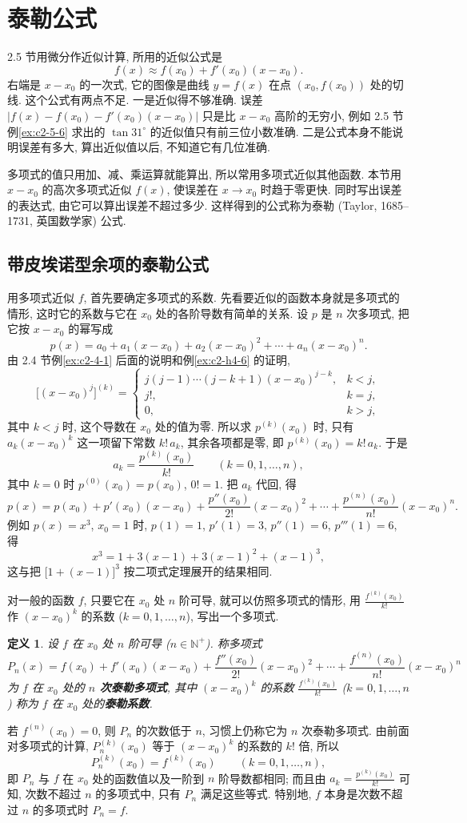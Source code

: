 \documentclass[UTF8,openany]{ctexbook}
\theoremstyle{chinesetextbook}
\newtheorem*{definitionsingle}{定义}
\begin{document}
\section{泰勒公式}
2.5 节用微分作近似计算, 所用的近似公式是
\[
f(x)\approx f(x_0)+f'(x_0)(x-x_0).
\]
右端是 $x-x_0$ 的一次式, 它的图像是曲线 $y=f(x)$ 在点 $(x_0,f(x_0))$ 处的切线. 这个公式有两点不足. 一是近似得不够准确. 误差 $\bigl|f(x)-f(x_0)-f'(x_0)(x-x_0)\bigr|$ 只是比 $x-x_0$ 高阶的无穷小, 例如 2.5 节例\ref{ex:c2-5-6} 求出的 $\tan31^\circ$ 的近似值只有前三位小数准确. 二是公式本身不能说明误差有多大, 算出近似值以后, 不知道它有几位准确.

多项式的值只用加、减、乘运算就能算出, 所以常用多项式近似其他函数. 本节用 $x-x_0$ 的高次多项式近似 $f(x)$, 使误差在 $x\to x_0$ 时趋于零更快. 同时写出误差的表达式, 由它可以算出误差不超过多少. 这样得到的公式称为泰勒 (Taylor, 1685--1731, 英国数学家) 公式.
\subsection{带皮埃诺型余项的泰勒公式}
用多项式近似 $f$, 首先要确定多项式的系数. 先看要近似的函数本身就是多项式的情形, 这时它的系数与它在 $x_0$ 处的各阶导数有简单的关系. 设 $p$ 是 $n$ 次多项式, 把它按 $x-x_0$ 的幂写成
\[
p(x)=a_0+a_1(x-x_0)+a_2(x-x_0)^2+\cdots+a_n(x-x_0)^n.
\]
由 2.4 节例\ref{ex:c2-4-1} 后面的说明和例\ref{ex:c2-h4-6} 的证明,
\[
\bigl[(x-x_0)^j\bigr]^{(k)}=\begin{cases}j(j-1)\cdots(j-k+1)(x-x_0)^{j-k},&k<j,\\j!,&k=j,\\0,&k>j,\end{cases}
\]
其中 $k<j$ 时, 这个导数在 $x_0$ 处的值为零. 所以求 $p^{(k)}(x_0)$ 时, 只有 $a_k(x-x_0)^k$ 这一项留下常数 $k!\,a_k$, 其余各项都是零, 即 $p^{(k)}(x_0)=k!\,a_k$. 于是
\[
a_k=\frac{p^{(k)}(x_0)}{k!}\qquad(k=0,1,\ldots,n),
\]
其中 $k=0$ 时 $p^{(0)}(x_0)=p(x_0)$, $0!=1$. 把 $a_k$ 代回, 得
\[
p(x)=p(x_0)+p'(x_0)(x-x_0)+\frac{p''(x_0)}{2!}(x-x_0)^2+\cdots+\frac{p^{(n)}(x_0)}{n!}(x-x_0)^n.
\]
例如 $p(x)=x^3$, $x_0=1$ 时, $p(1)=1$, $p'(1)=3$, $p''(1)=6$, $p'''(1)=6$, 得
\[
x^3=1+3(x-1)+3(x-1)^2+(x-1)^3,
\]
这与把 $\bigl[1+(x-1)\bigr]^3$ 按二项式定理展开的结果相同.

对一般的函数 $f$, 只要它在 $x_0$ 处 $n$ 阶可导, 就可以仿照多项式的情形, 用 $\displaystyle\frac{f^{(k)}(x_0)}{k!}$ 作 $(x-x_0)^k$ 的系数 ($k=0,1,\ldots,n$), 写出一个多项式.
\begin{definitionsingle}
设 $f$ 在 $x_0$ 处 $n$ 阶可导 ($n\in\mathbb N^+$). 称多项式
\[
P_n(x)=f(x_0)+f'(x_0)(x-x_0)+\frac{f''(x_0)}{2!}(x-x_0)^2+\cdots+\frac{f^{(n)}(x_0)}{n!}(x-x_0)^n
\]
为 $f$ 在 $x_0$ 处的 \textbf{$n$ 次泰勒多项式}, 其中 $(x-x_0)^k$ 的系数 $\displaystyle\frac{f^{(k)}(x_0)}{k!}$ ($k=0,1,\ldots,n$) 称为 $f$ 在 $x_0$ 处的\textbf{泰勒系数}.
\end{definitionsingle}
若 $f^{(n)}(x_0)=0$, 则 $P_n$ 的次数低于 $n$, 习惯上仍称它为 $n$ 次泰勒多项式. 由前面对多项式的计算, $P_n^{(k)}(x_0)$ 等于 $(x-x_0)^k$ 的系数的 $k!$ 倍, 所以
\[
P_n^{(k)}(x_0)=f^{(k)}(x_0)\qquad(k=0,1,\ldots,n),
\]
即 $P_n$ 与 $f$ 在 $x_0$ 处的函数值以及一阶到 $n$ 阶导数都相同; 而且由 $\displaystyle a_k=\frac{p^{(k)}(x_0)}{k!}$ 可知, 次数不超过 $n$ 的多项式中, 只有 $P_n$ 满足这些等式. 特别地, $f$ 本身是次数不超过 $n$ 的多项式时 $P_n=f$.
\end{document}
